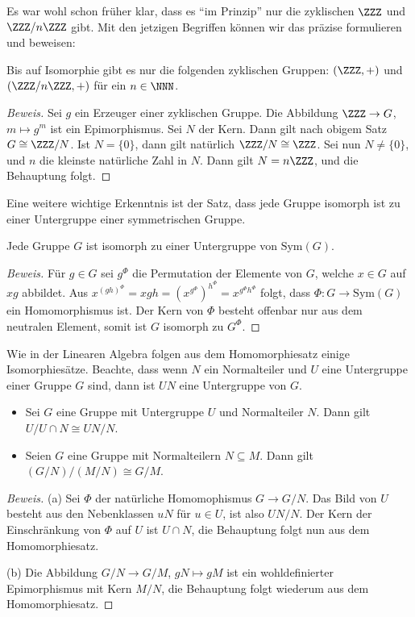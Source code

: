 \documentclass[12pt,a4paper,twoside]{article}
\begin{document}
Es war wohl schon fr\"uher klar, dass es ``im Prinzip'' nur die zyklischen
$\ZZZ$ und $\ZZZ/n\ZZZ$ gibt. Mit den jetzigen Begriffen k\"onnen wir das
pr\"azise formulieren und beweisen:
\begin{Korollar}
  Bis auf Isomorphie gibt es nur die folgenden zyklischen Gruppen: $(\ZZZ,+)$
  und $(\ZZZ/n\ZZZ,+)$ f\"ur ein $n\in\NNN$.
\end{Korollar}
\begin{proof}[Beweis]
  Sei $g$ ein Erzeuger einer zyklischen Gruppe. Die Abbildung $\ZZZ\to G$,
  $m\mapsto g^m$ ist ein Epimorphismus. Sei $N$ der Kern. Dann gilt nach
  obigem Satz $G\cong\ZZZ/N$. Ist $N=\{0\}$, dann gilt nat\"urlich
  $\ZZZ/N\cong\ZZZ$. Sei nun $N\ne\{0\}$, und $n$ die kleinste nat\"urliche
  Zahl in $N$. Dann gilt $N=n\ZZZ$, und die Behauptung folgt.
\end{proof}
Eine weitere wichtige Erkenntnis ist der Satz, dass jede Gruppe isomorph ist
zu einer Untergruppe einer symmetrischen Gruppe.
\begin{Satz}[Cayley]
  Jede Gruppe $G$ ist isomorph zu einer Untergruppe von $\text{Sym}(G)$.
\end{Satz}
\begin{proof}[Beweis]
  F\"ur $g\in G$ sei $g^\Phi$ die Permutation der Elemente von $G$, welche
  $x\in G$ auf $xg$ abbildet. Aus
  $x^{(gh)^\Phi}=xgh=(x^{g^\Phi})^{h^\Phi}=x^{g^\Phi h^\Phi}$ folgt, dass
  $\Phi:G\to\text{Sym}(G)$ ein Homomorphismus ist. Der Kern von $\Phi$ besteht
  offenbar nur aus dem neutralen Element, somit ist $G$ isomorph zu $G^\Phi$.
\end{proof}
Wie in der Linearen Algebra folgen aus dem Homomorphiesatz einige
Isomorphies\"atze. Beachte, dass wenn $N$ ein Normalteiler und $U$ eine
Untergruppe einer Gruppe $G$ sind, dann ist $UN$ eine Untergruppe von $G$.
\begin{Satz}
  \begin{itemize}
  \item[(a)] Sei $G$ eine Gruppe mit Untergruppe $U$ und Normalteiler $N$.
    Dann gilt $U/U\cap N\cong UN/N$.
  \item[(b)] Seien $G$ eine Gruppe mit Normalteilern $N\subseteq M$. Dann gilt
  $(G/N)/(M/N)\cong G/M$.
  \end{itemize}
\end{Satz}
\begin{proof}[Beweis]
  (a) Sei $\Phi$ der nat\"urliche Homomophismus $G\to G/N$. Das Bild von $U$
  besteht aus den Nebenklassen $uN$ f\"ur $u\in U$, ist also $UN/N$. Der Kern
  der Einschr\"ankung von $\Phi$ auf $U$ ist $U\cap N$, die Behauptung folgt
  nun aus dem Homomorphiesatz.

(b) Die Abbildung $G/N\to G/M$, $gN\mapsto gM$ ist ein wohldefinierter
Epimorphismus mit Kern $M/N$, die Behauptung folgt wiederum aus dem
Homomorphiesatz.
\end{proof}
\end{document}
